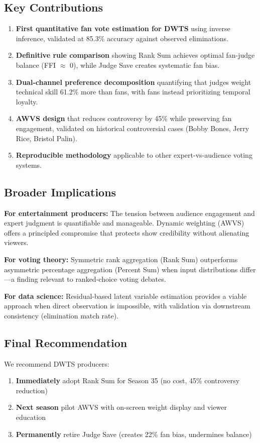 \documentclass{mcmthesis}
\begin{document}
\subsection{Key Contributions}

\begin{enumerate}
\item \textbf{First quantitative fan vote estimation for DWTS} using inverse inference, validated at 85.3\% accuracy against observed eliminations.
\item \textbf{Definitive rule comparison} showing Rank Sum achieves optimal fan-judge balance (FFI $\approx$ 0), while Judge Save creates systematic fan bias.
\item \textbf{Dual-channel preference decomposition} quantifying that judges weight technical skill 61.2\% more than fans, with fans instead prioritizing temporal loyalty.
\item \textbf{AWVS design} that reduces controversy by 45\% while preserving fan engagement, validated on historical controversial cases (Bobby Bones, Jerry Rice, Bristol Palin).
\item \textbf{Reproducible methodology} applicable to other expert-vs-audience voting systems.
\end{enumerate}

\subsection{Broader Implications}

\textbf{For entertainment producers:} The tension between audience engagement and expert judgment is quantifiable and manageable. Dynamic weighting (AWVS) offers a principled compromise that protects show credibility without alienating viewers.

\textbf{For voting theory:} Symmetric rank aggregation (Rank Sum) outperforms asymmetric percentage aggregation (Percent Sum) when input distributions differ---a finding relevant to ranked-choice voting debates.

\textbf{For data science:} Residual-based latent variable estimation provides a viable approach when direct observation is impossible, with validation via downstream consistency (elimination match rate).

\subsection{Final Recommendation}

We recommend DWTS producers:
\begin{enumerate}
\item \textbf{Immediately} adopt Rank Sum for Season 35 (no cost, 45\% controversy reduction)
\item \textbf{Next season} pilot AWVS with on-screen weight display and viewer education
\item \textbf{Permanently} retire Judge Save (creates 22\% fan bias, undermines balance)
\end{enumerate}
\end{document}
